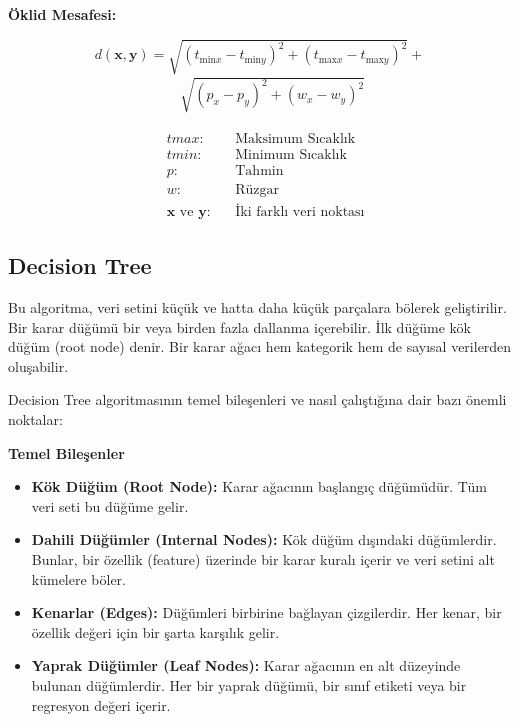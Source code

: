 \documentclass[twocolumn]{article}
\begin{document}
\begin{enumerate}
		\textbf{Öklid Mesafesi:} 
		
		\[
		d(\mathbf{x}, \mathbf{y}) = \sqrt{(t_{\text{min}x} - t_{\text{min}y})^2 + (t_{\text{max}x} - t_{\text{max}y})^2} + 
		\]
		\[
		\begin{aligned}
			&\quad \sqrt{(p_x - p_y)^2 + (w_x - w_y)^2}
		\end{aligned}
		\]
		
		\[
		\begin{aligned}
			& t max: && \text{Maksimum Sıcaklık} \\
			& t min: && \text{Minimum Sıcaklık} \\
			& p: && \text{Tahmin} \\
			& w: && \text{Rüzgar} \\
			& \mathbf{x} \text{ ve } \mathbf{y}: && \text{İki farklı veri noktası}
		\end{aligned}
		\]
	\end{enumerate}
	
	\subsection{Decision Tree}
	
	Bu algoritma, veri setini küçük ve hatta daha küçük parçalara bölerek geliştirilir. Bir karar düğümü bir veya birden fazla dallanma içerebilir. İlk düğüme kök düğüm (root node) denir. Bir karar ağacı hem kategorik hem de sayısal verilerden oluşabilir. \cite{decision_tree_id3}
	
	Decision Tree algoritmasının temel bileşenleri ve nasıl çalıştığına dair bazı önemli noktalar:
	
	\textbf{Temel Bileşenler}
	
	\begin{itemize}
		\item \textbf{Kök Düğüm (Root Node):} Karar ağacının başlangıç düğümüdür. Tüm veri seti bu düğüme gelir.
		\item \textbf{Dahili Düğümler (Internal Nodes):} Kök düğüm dışındaki düğümlerdir. Bunlar, bir özellik (feature) üzerinde bir karar kuralı içerir ve veri setini alt kümelere böler.
		\item \textbf{Kenarlar (Edges):} Düğümleri birbirine bağlayan çizgilerdir. Her kenar, bir özellik değeri için bir şarta karşılık gelir.
		\item \textbf{Yaprak Düğümler (Leaf Nodes):} Karar ağacının en alt düzeyinde bulunan düğümlerdir. Her bir yaprak düğümü, bir sınıf etiketi veya bir regresyon değeri içerir.
	\end{itemize}
	
\end{document}
